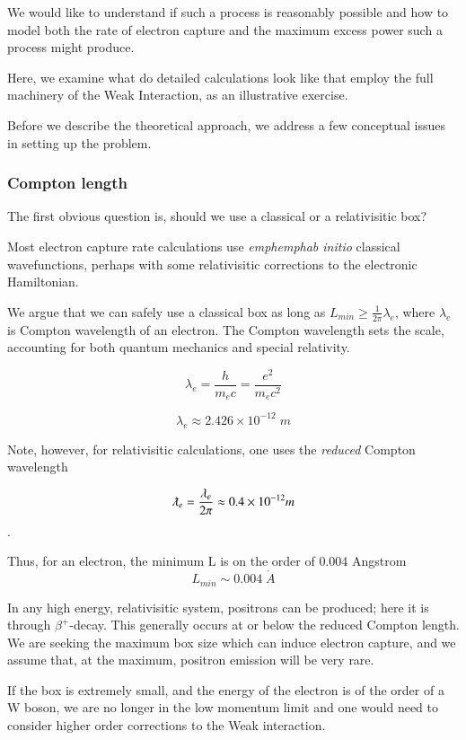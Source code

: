 \documentclass[%
 aip,
 jmp,%
 amsmath,amssymb,
 reprint,%
]{revtex4-1}
\begin{document}
We would like to understand if such a process is reasonably possible and how to model both the rate of electron capture and the maximum excess power such a process might produce.

Here, we examine what do detailed calculations look like that employ the full machinery of the Weak Interaction, as an illustrative exercise.

Before we describe the theoretical approach, we address a few conceptual issues in setting up the problem.

\subsubsection{Compton length}
The first obvious question is, should we use a classical or a relativisitic box?   

Most electron capture rate calculations use \emph{emph{emph{ab initio}}} classical wavefunctions,\cite{ec-review1,ec-review2} perhaps with some relativisitic corrections to the electronic Hamiltonian. \cite{martin}

We argue that we can safely use a classical box as long as $L_{min} \ge \frac{1}{2\pi}\lambda_{e}$, where $\lambda_{e}$ is Compton wavelength of an electron. \cite{relbox,compton,planck}  The Compton wavelength sets the scale, accounting for both quantum mechanics and special relativity.

$$\lambda_{e}=\dfrac{h}{m_{e}c}=\dfrac{e^{2}}{m_{e}c^{2}}$$

$$\lambda_{e}\approx2.426\times 10^{-12}\;m$$

Note, however,  for relativisitic calculations, one uses the \emph{reduced} Compton wavelength 

$$\lambdabar_{e}=\frac{\lambda_{e}}{2\pi}\approx0.4\times 10^{-12}m$$.

Thus, for an electron, the minimum L is on the order of 0.004 Angstrom 
$$L_{min}\sim0.004\;\mathring{A}$$ 

In any high energy, relativisitic system, positrons can be produced; here it is through $\beta^{+}$-decay. This generally occurs at or below the reduced Compton length. We are seeking the maximum box size which can induce electron capture, and we assume that, at the maximum, positron emission will be very rare.

If the box is extremely small, and the energy of the electron is of the order of a W boson, we are no longer in the low momentum limit and one would need to consider higher order corrections to the Weak interaction.\cite{klein1}
\end{document}
